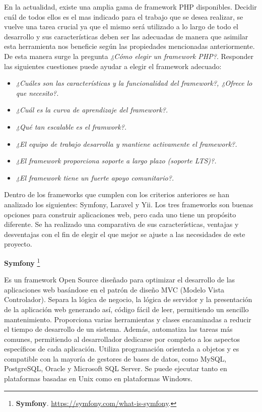 \documentclass[11pt,oneside]{book}
\begin{document}
En la actualidad, existe una amplia gama de framework PHP disponibles. Decidir cuál de todos ellos es el mas indicado para el trabajo que se desea realizar, se vuelve una tarea crucial ya que el mismo será utilizado a lo largo de todo el desarrollo y sus características deben ser las adecuadas de manera que asimilar esta herramienta nos beneficie según las propiedades mencionadas anteriormente. De esta manera surge la pregunta \textit{¿Cómo elegir un framework PHP?}. Responder las siguientes cuestiones puede ayudar a elegir el framework adecuado:
\begin{itemize}
\item \textit{¿Cuáles son las características y la funcionalidad del framework?, ¿Ofrece lo que necesito?.}
\item \textit{¿Cuál es la curva de aprendizaje del framework?.}
\item \textit{¿Qué tan escalable es el framwork?.}
\item \textit{¿El equipo de trabajo desarrolla y mantiene activamente el framework?.}
\item \textit{¿El framework proporciona soporte a largo plazo (soporte LTS)?.}
\item \textit{¿El framework tiene un fuerte apoyo comunitario?.}
\end{itemize}

\newpage
Dentro de los frameworks que cumplen con los criterios anteriores se han analizado los siguientes: Symfony, Laravel y Yii. Los tres frameworks son buenas opciones para construir aplicaciones web, pero cada uno tiene un propósito diferente. Se ha realizado una comparativa de sus características, ventajas y desventajas con el fin de elegir el que mejor se ajuste a las necesidades de este proyecto.

\textbf{Symfony} \footnote{\textbf{Symfony}. \url{https://symfony.com/what-is-symfony}.}

Es un framework Open Source diseñado para optimizar el desarrollo de las aplicaciones web basándose en el patrón de diseño MVC (Modelo Vista Controlador). Separa la lógica de negocio, la lógica de servidor y la presentación de la aplicación web generando así, código fácil de leer, permitiendo un sencillo mantenimiento. Proporciona varias herramientas y clases encaminadas a reducir el tiempo de desarrollo de un sistema. Además, automatiza las tareas más comunes, permitiendo al desarrollador dedicarse por completo a los aspectos específicos de cada aplicación. Utiliza programación orienteda a objetos y es compatible con la mayoría de gestores de bases de datos, como MySQL, PostgreSQL, Oracle y Microsoft SQL Server. Se puede ejecutar tanto en plataformas basadas en Unix como en plataformas Windows.
\end{document}
